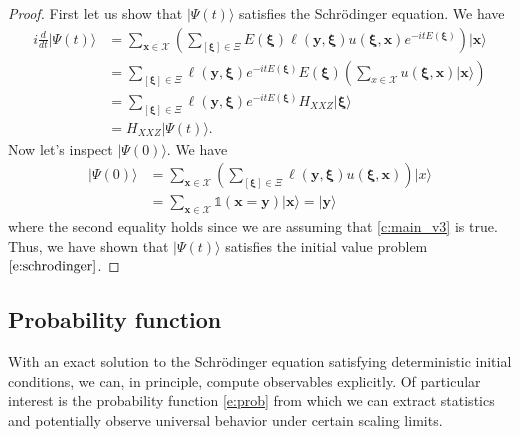 \documentclass[a4paper,11pt]{article}
\theoremstyle{definition}
\begin{document}
\begin{proof}
First let us show that $|\Psi(t)\rangle$ satisfies the Schr\"odinger equation. We have
\begin{equation}
    \begin{split}
    i\frac{d}{dt}|\Psi(t)\rangle &= \sum_{\mathbf{x}\in \mathcal{X}}\left(\sum_{[\boldsymbol{\xi}]\in\Xi}E(\boldsymbol{\xi})\ell(\mathbf{y},\boldsymbol{\xi})u(\boldsymbol{\xi},\mathbf{x})e^{-itE(\boldsymbol{\xi})} \right)|\mathbf{x}\rangle \\
    &=\sum_{[\boldsymbol{\xi}]\in\Xi}\ell(\mathbf{y},\boldsymbol{\xi})e^{-itE(\boldsymbol{\xi})}E(\boldsymbol{\xi})\left(\sum_{x\in \mathcal{X}}u(\boldsymbol{\xi},\mathbf{x})|\mathbf{x}\rangle\right) \\ 
    &=\sum_{[\boldsymbol{\xi}]\in\Xi}\ell(\mathbf{y},\boldsymbol{\xi})e^{-itE(\boldsymbol{\xi})}H_{XXZ}|\boldsymbol{\xi}\rangle \\
    &= H_{XXZ}|\Psi(t)\rangle.
    \end{split}
\end{equation}
Now let's inspect $|\Psi(0)\rangle$. We have
\begin{equation}
    \begin{split}
        |\Psi(0)\rangle &= \sum_{\mathbf{x}\in \mathcal{X}}\left(\sum_{[\boldsymbol{\xi}]\in\Xi}\ell(\mathbf{y},\boldsymbol{\xi})u(\boldsymbol{\xi},\mathbf{x}) \right)|x\rangle \\
        &= \sum_{\mathbf{x}\in \mathcal{X}} \mathds{1}(\mathbf{x}=\mathbf{y}) |\mathbf{x}\rangle = |\mathbf{y}\rangle
    \end{split}
\end{equation}
where the second equality holds since we are assuming that \eqref{c:main_v3} is true. Thus, we have shown that $|\Psi(t)\rangle$ satisfies the initial value problem $\eqref{e:schrodinger}$.  
\end{proof}

\subsection{Probability function}

With an exact solution to the Schr\"odinger equation satisfying deterministic initial conditions, we can, in principle, compute observables explicitly. Of particular interest is the probability function \eqref{e:prob} from which we can extract statistics and potentially observe universal behavior under certain scaling limits. 
\end{document}
